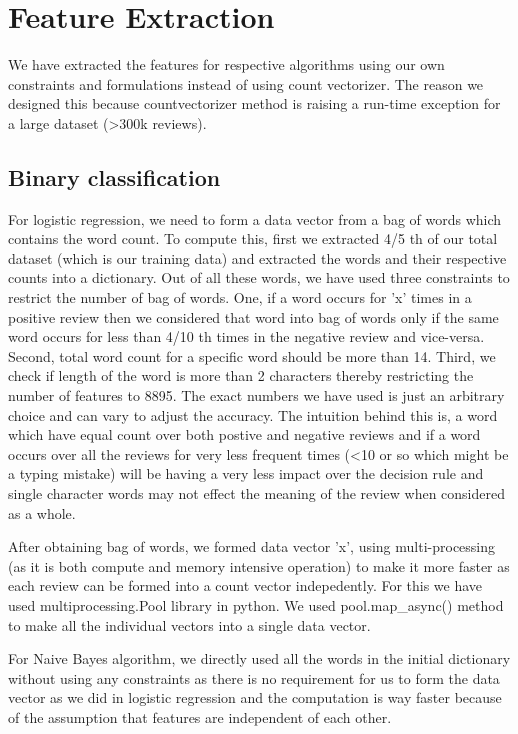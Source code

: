 \documentclass{article}
\begin{document}

\section{Feature Extraction}

We have extracted the features for respective algorithms using our own constraints and formulations instead of using count vectorizer. The reason we designed this because countvectorizer method is raising a run-time exception for a large dataset (\textgreater300k reviews).

\subsection{Binary classification}
For logistic regression, we need to form a data vector from a bag of words which contains the word count. To compute this, first we extracted 4/5 th of our total dataset (which is our training data) and extracted the words and their respective counts into a dictionary. Out of all these words, we have used three constraints to restrict the number of bag of words. One, if a word occurs for 'x' times in a positive review then we considered that word into bag of words only if the same word occurs for less than 4/10 th times in the negative review and vice-versa. Second, total word count for a specific word should be more than 14. Third, we check if length of the word is more than 2 characters thereby restricting the number of features to 8895. The exact numbers we have used is just an arbitrary choice and can vary to adjust the accuracy. The intuition behind this is, a word which have equal count over both postive and negative reviews and if a word occurs over all the reviews for very less frequent times (\textless10 or so which might be a typing mistake) will be having a very less impact over the decision rule and single character words may not effect the meaning of the review when considered as a whole.

After obtaining bag of words, we formed data vector 'x', using multi-processing (as it is both compute and memory intensive operation) to make it more faster as each review can be formed into a count vector indepedently. For this we have used multiprocessing.Pool library in python. We used pool.map\_async() method to make all the individual vectors into a single data vector. 

For Naive Bayes algorithm, we directly used all the words in the initial dictionary without using any constraints as there is no requirement for us to form the data vector as we did in logistic regression and the computation is way faster because of the assumption that features are independent of each other. 
\end{document}
